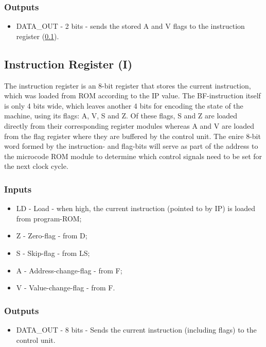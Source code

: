 \subsubsection*{Outputs}
\begin{itemize}
\itemsep0em 
\item DATA\_OUT - 2 bits - sends the stored A and V flags to the instruction register (\ref{sec:architecture:i}).
\end{itemize}


\subsection{Instruction Register (I)} \label{sec:architecture:i}
The instruction register is an 8-bit register that stores the current instruction, which was loaded from ROM according to the IP value. The BF-instruction itself is only 4 bits wide, which leaves another 4 bits for encoding the state of the machine, using its flags:  A, V, S and Z. Of these flags, S and Z are loaded directly from their corresponding register modules whereas A and V are loaded from the flag register where they are buffered by the control unit. The enire 8-bit word formed by the instruction- and flag-bits will serve as part of the address to the microcode ROM module to determine which control signals need to be set for the next clock cycle.

\subsubsection*{Inputs}
\begin{itemize}
\itemsep0em 
\item LD - Load - when high, the current instruction (pointed to by IP) is loaded from program-ROM;
\item Z - Zero-flag - from D;
\item S - Skip-flag - from LS;
\item A - Address-change-flag - from F;
\item V - Value-change-flag - from F.
\end{itemize}

\subsubsection*{Outputs}
\begin{itemize}
\item DATA\_OUT - 8 bits - Sends the current instruction (including flags) to the control unit.
\end{itemize}


